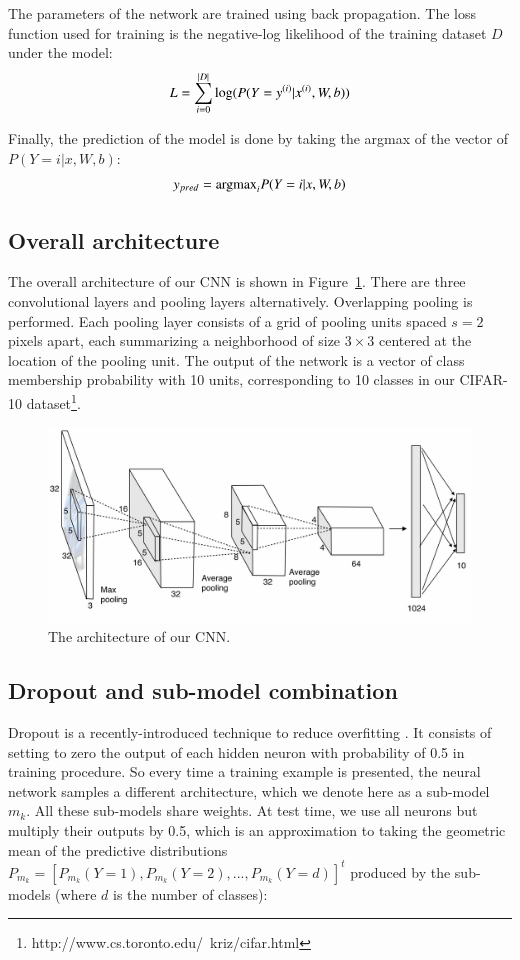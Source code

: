 \documentclass{article} %
\begin{document}
\par
The parameters of the network are trained using back propagation\cite{backprop}. The loss function used for training is the negative-log likelihood of the training dataset $D$ under the model:
\begin{equation}
L = \sum_{i=0}^{|D|}\textup{log}(P(Y=y^{(i)}|x^{(i)},W,b))
\end{equation}
\par
Finally, the prediction of the model is done by taking the argmax of the vector of $P(Y=i|x,W,b)$:
\begin{equation}
y_{pred}=\textup{argmax}_{i}P(Y=i|x,W,b)
\end{equation}

\subsection{Overall architecture}
The overall architecture of our CNN is shown in Figure~\ref{fig1}. There are three convolutional layers and pooling layers alternatively. Overlapping pooling is performed. Each pooling layer consists of a grid of pooling units spaced $s=2$ pixels apart, each summarizing a neighborhood of size $3\times3$ centered at the location of the pooling unit. The output of the network is a vector of class membership probability with 10 units, corresponding to 10 classes in our CIFAR-10 dataset\footnote{http://www.cs.toronto.edu/~kriz/cifar.html}.

\begin{figure}
\centering
\includegraphics[width=1\textwidth]{architecture}
\caption{The architecture of our CNN.}
\label{fig1}
\end{figure}
\subsection{Dropout and sub-model combination}
Dropout is a recently-introduced technique to reduce overfitting \cite{imagenet}. It consists of setting to zero the output of each hidden neuron with probability of 0.5 in training procedure.  So every time a training example is presented, the neural network samples a different architecture, which we denote here as a sub-model $m_{k}$. All these sub-models share weights. At test time, we use all neurons but multiply their outputs by 0.5, which is an approximation to taking the geometric mean of the predictive distributions $P_{m_{k}}=\left [ P_{m_{k}}(Y=1),P_{m_{k}}(Y=2),...,P_{m_{k}}(Y=d) \right ]^{t}$ produced by the sub-models (where $d$ is the number of classes):
\end{document}
